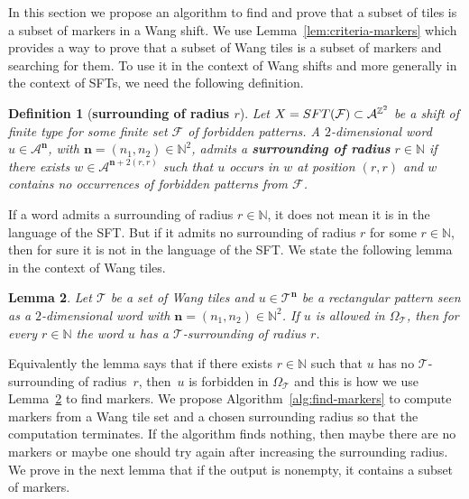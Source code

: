\documentclass[12pt]{amsart}
\newtheorem{definition}{Definition}[section]
\newtheorem{lemma}[definition]{Lemma}
\newcommand{\N}{\mathbb{N}}
\newcommand{\Z}{\mathbb{Z}}
\newcommand{\bn}{{\boldsymbol{n}}}
\newcommand{\Acal}{\mathcal{A}} %
\newcommand{\Fcal}{\mathcal{F}}
\newcommand{\Tcal}{\mathcal{T}}
\newcommand{\SFT}{\textsc{SFT}}
\newcommand{\ifnv}[2]{\ifthenelse{\equal{#1}{}}{}{#2}}
\newcommand\defn[2][]{\ifnv{#1}{\index{#1|\textbf}}{\index{#2|\textbf}}\textbf{#2}}
\begin{document}
In this section we propose an algorithm to find and prove that a subset of
tiles is a subset of markers in a Wang shift.
We use Lemma~\ref{lem:criteria-markers} which provides a way to prove that a
subset of Wang tiles is a subset of markers and searching for them. 
To use it in the context of Wang shifts and more generally in the context of
SFTs, we need the following definition.

\begin{definition}[\bf surrounding of radius $r$]
    Let $X=\SFT(\Fcal)\subset\Acal^{\Z^2}$ be a shift of finite type for some
    finite set $\Fcal$ of forbidden patterns. A $2$-dimensional word
$u\in\Acal^\bn$,
with $\bn=(n_1,n_2)\in\N^2$,
admits a \defn{surrounding of radius} $r\in\N$
if there exists $w\in\Acal^{\bn+2(r,r)}$ 
such that 
    $u$ occurs in $w$ at position $(r,r)$
    and
$w$ contains no occurrences of forbidden patterns from $\Fcal$.
\end{definition}

If a word admits a surrounding of radius $r\in\N$, it does not mean
it is in the language of the SFT. But if it admits no surrounding of radius $r$
for some $r\in\N$, then for sure it is not in the language of the SFT.
We state the following lemma in the context of Wang tiles.

\begin{lemma}\label{lem:surrounding}
    Let $\Tcal$ be a set of Wang tiles and $u\in\Tcal^\bn$ be a rectangular pattern
    seen as a $2$-dimensional word with $\bn=(n_1,n_2)\in\N^2$. If
    $u$ is allowed in $\Omega_\Tcal$, then for every $r\in\N$ the word $u$ has a
    $\Tcal$-surrounding of radius $r$.
\end{lemma}

Equivalently the lemma says that
if there exists $r\in\N$ such that $u$ has no $\Tcal$-surrounding of radius~$r$,
then~$u$ is forbidden in $\Omega_\Tcal$ and this is how we use
Lemma~\ref{lem:surrounding} to find markers.
We propose Algorithm~\ref{alg:find-markers} to compute markers from a Wang
tile set and a chosen surrounding radius so that the computation terminates.
If the algorithm finds nothing, then maybe there are no markers or maybe 
one should try again after increasing the surrounding radius.
We prove in the next lemma that if the output is nonempty, it contains a subset of markers.
\end{document}
